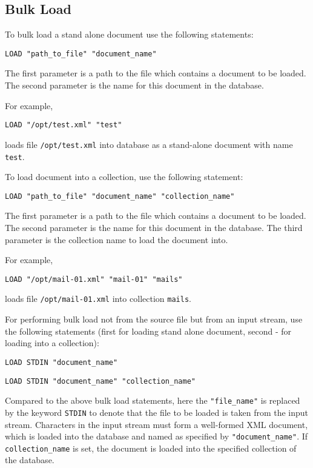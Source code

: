 \documentclass[a4paper,12pt]{article}
\begin{document}
\subsection{Bulk Load}
\label{bulk-load}

To bulk load a stand alone document use the following statements:
\begin{verbatim}
LOAD "path_to_file" "document_name"
\end{verbatim}
The first parameter is a path to the file which contains a document to be
loaded. The second parameter is the name for this document in the database.

For example,
\begin{verbatim}
LOAD "/opt/test.xml" "test"
\end{verbatim}
loads file \verb!/opt/test.xml! into database as a stand-alone document with
name \verb!test!.

To load document into a collection, use the following statement:
\begin{verbatim}
LOAD "path_to_file" "document_name" "collection_name"
\end{verbatim}
The first parameter is a path to the file which contains a document to be
loaded. The second parameter is the name for this document in the database. The
third parameter is the collection name to load the document into.

For example,
\begin{verbatim}
LOAD "/opt/mail-01.xml" "mail-01" "mails"
\end{verbatim}
loads file \verb!/opt/mail-01.xml! into collection \verb!mails!.

For performing bulk load not from the source file but from an input stream,
use the following statements (first for loading stand alone document, second -
for loading into a collection):
\begin{verbatim}
LOAD STDIN "document_name"
\end{verbatim}
\begin{verbatim}
LOAD STDIN "document_name" "collection_name"
\end{verbatim}

Compared to the above bulk load statements, here the \verb!"file_name"! is
replaced by the keyword \verb!STDIN! to denote that the file to be loaded is
taken from the input stream. Characters in the input stream must form a
well-formed XML document, which is loaded into the database and named as
specified by \verb!"document_name"!. If \verb!collection_name! is set, the
document is loaded into the specified collection of the database.
\end{document}
